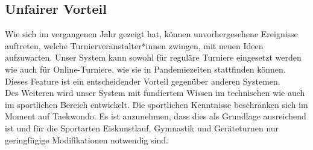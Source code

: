 \subsection{Unfairer Vorteil}
Wie sich im vergangenen Jahr gezeigt hat, können unvorhergesehene Ereignisse auftreten, welche Turnierveranstalter*innen zwingen, mit neuen Ideen aufzuwarten. Unser System kann sowohl für reguläre Turniere eingesetzt werden wie auch für Online-Turniere, wie sie in Pandemiezeiten stattfinden können. Dieses Feature ist ein entscheidender Vorteil gegenüber anderen Systemen.\\
Des Weiteren wird unser System mit fundiertem Wissen im technischen wie auch im sportlichen Bereich entwickelt. Die sportlichen Kenntnisse beschränken sich im Moment auf Taekwondo. Es ist anzunehmen, dass dies als Grundlage ausreichend ist und für die Sportarten Eiskunstlauf, Gymnastik und Geräteturnen nur geringfügige Modifikationen notwendig sind.